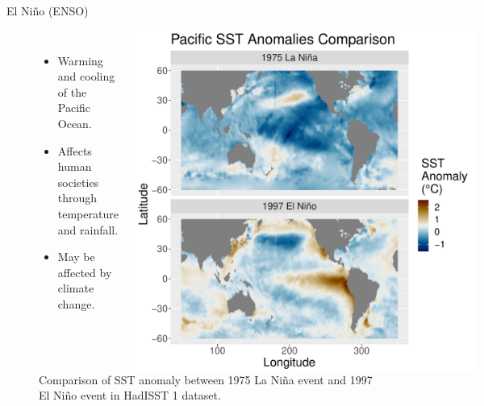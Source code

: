 \documentclass{beamer}
\begin{document}
\begin{frame}{El Niño (ENSO)}
  \begin{figure}
    \begin{columns}
      \begin{itemize}
      \item Warming and cooling of the Pacific Ocean.
      \item Affects human societies through temperature and rainfall. \citep{ropelewski1987global}
      \item May be affected by climate change.
      \end{itemize}
      \caption{Comparison of SST anomaly between 1975 La Niña event and 1997 El Niño event in HadISST 1 dataset. \citep{rayner2003global}}
      \includegraphics[width = \textwidth]{figures/intro_fig.pdf}
    \end{columns}
  \end{figure}
\end{frame}
\end{document}
